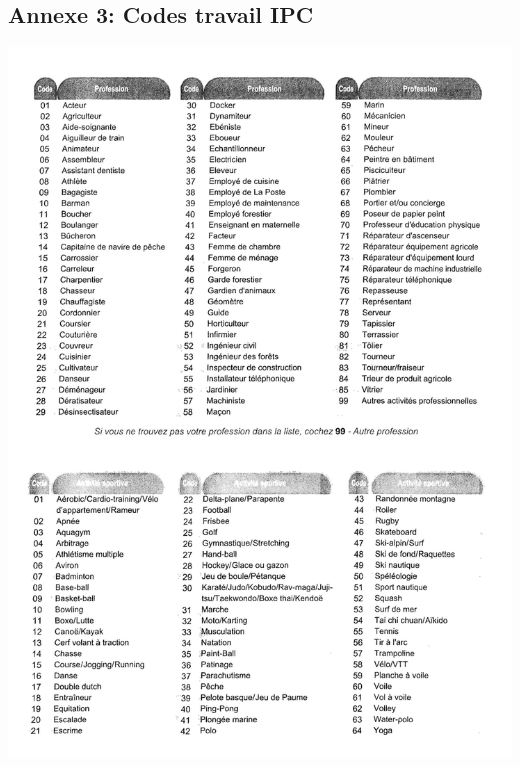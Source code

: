 \documentclass{book}
\begin{document}
\subsection{Annexe 3: Codes travail IPC}
\includegraphics[scale=.25]{codesIPC_1.png}
\newpage
\end{document}
